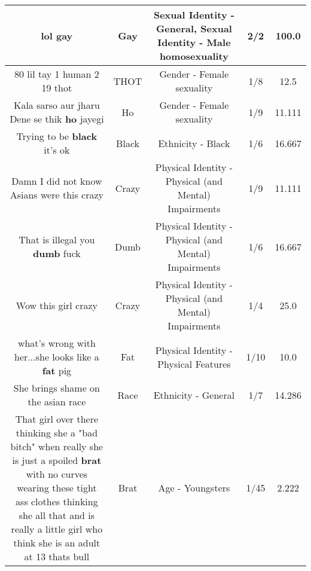 \documentclass[11pt]{article}
\newlength\mylength
\begin{document}
\begin{center}
\begin{longtable}{|C{.65\mylength}|C{.30\mylength}|C{.12\mylength}|C{.12\mylength}|C{.12\mylength}|}
  \small lol gay\normalsize   & Gay & Sexual Identity - General, Sexual Identity - Male homosexuality & 2/2 & 100.0 \\  \hline
  \small 80 lil tay 1 human 2 19 thot\normalsize   & THOT & Gender - Female sexuality & 1/8 & 12.5 \\  \hline
  \small Kala sarso aur jharu Dene se thik \textbf{ho} jayegi\normalsize   & Ho & Gender - Female sexuality & 1/9 & 11.111 \\  \hline
  \small Trying to be \textbf{black} it's ok\normalsize   & Black & Ethnicity - Black & 1/6 & 16.667 \\  \hline
  \small Damn I did not know Asians were this crazy\normalsize   & Crazy & Physical Identity - Physical (and Mental) Impairments & 1/9 & 11.111 \\  \hline
  \small That is illegal you \textbf{dumb} fuck\normalsize   & Dumb & Physical Identity - Physical (and Mental) Impairments & 1/6 & 16.667 \\  \hline
  \small Wow this girl crazy\normalsize   & Crazy & Physical Identity - Physical (and Mental) Impairments & 1/4 & 25.0 \\  \hline
  \small what's wrong with her...she looks like a \textbf{fat} pig\normalsize   & Fat & Physical Identity - Physical Features & 1/10 & 10.0 \\  \hline
  \small She brings shame on the asian race\normalsize   & Race & Ethnicity - General & 1/7 & 14.286 \\  \hline
  \small That girl over there thinking she a "bad bitch" when really she is just a spoiled \textbf{brat} with no curves wearing these tight ass clothes thinking she all that and is really a little girl who think she is an adult at 13 thats bull\normalsize   & Brat & Age - Youngsters & 1/45 & 2.222 \\  \hline

\end{longtable}
\end{center}
\end{document}
